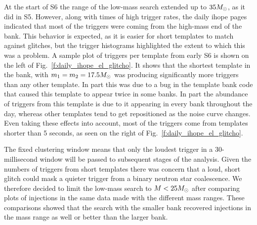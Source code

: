 At the start of S6 the range of the low-mass search extended up to $35
M_\odot$, as it did in S5.  However, along with times of high trigger
rates, the daily ihope pages indicated that most of the triggers were
coming from the high-mass end of the bank.  This behavior is expected,
as it is easier for short templates to match against glitches, but the
trigger histograms highlighted the extent to which this was a problem.
A sample plot of triggers per template from early S6 is shown on the
left of Fig.~\ref{f:daily_ihope_el_glitcho}.  It shows that the
shortest template in the bank, with $m_1 = m_2 = 17.5 M_\odot$ was
producing significantly more triggers than any other template.  In
part this was due to a bug in the template bank code that caused this
template to appear twice in some banks.  In part the abundance of
triggers from this template is due to it appearing in every bank
throughout the day, whereas other templates tend to get repositioned
as the noise curve changes.  Even taking these effects into account,
most of the triggers come from templates shorter than 5 seconds, as
seen on the right of Fig.~\ref{f:daily_ihope_el_glitcho}.

The fixed clustering window means that only the loudest trigger in a
30-millisecond window will be passed to subsequent stages of the
analysis.  Given the numbers of triggers from short templates there
was concern that a loud, short glitch could mask a quieter trigger
from a binary neutron star coalescence.  We therefore decided to limit
the low-mass search to $M < 25 M_\odot$ after comparing plots of
injections in the same data made with the different mass ranges.
These comparisons showed that the search with the smaller bank
recovered injections in the mass range as well or better than the
larger bank.


